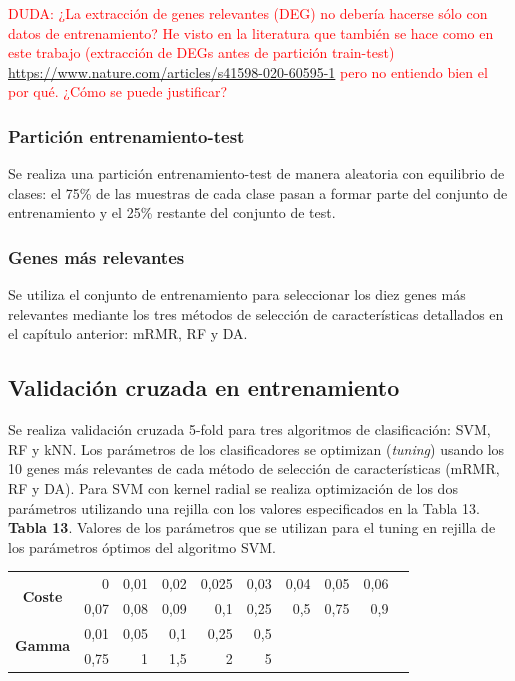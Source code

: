 \textcolor{red}{DUDA: ¿La extracción de genes relevantes (DEG) no debería hacerse sólo con datos de entrenamiento? He visto en la literatura que también se hace como en este trabajo (extracción de DEGs antes de partición train-test) \url{https://www.nature.com/articles/s41598-020-60595-1} pero no entiendo bien el por qué. ¿Cómo se puede justificar?}\\

\subsubsection{Partición entrenamiento-test}

Se realiza una partición entrenamiento-test de manera aleatoria con equilibrio de clases: el 75\% de las muestras de cada clase pasan a formar parte del conjunto de entrenamiento y el 25\% restante del conjunto de test.

\subsubsection{Genes más relevantes}

Se utiliza el conjunto de entrenamiento para seleccionar los diez genes más relevantes mediante los tres métodos de selección de características detallados en el capítulo anterior: mRMR, RF y DA.

\subsection{Validación cruzada en entrenamiento}

Se realiza validación cruzada 5-fold para tres algoritmos de clasificación: SVM, RF y kNN. Los parámetros de los clasificadores se optimizan (\textit{tuning}) usando los 10 genes más relevantes de cada método de selección de características (mRMR, RF y DA). Para SVM con kernel radial se realiza optimización de los dos parámetros utilizando una rejilla con los valores especificados en la Tabla 13.\\

\textbf{Tabla 13}. Valores de los parámetros que se utilizan para el tuning en rejilla de los parámetros óptimos del algoritmo SVM.

\begin{table}[H]
	\centering
	\begin{tabular}{crrrrrrrrr}
		\hline
		\multirow{2}{*}{\textbf{Coste}} & 0    & 0,01 & 0,02         & 0,025                             & 0,03 & 0,04 & 0,05 & 0,06 \\
		& 0,07 & 0,08 & 0,09         & 0,1                               & 0,25 & 0,5  & 0,75 & 0,9  \\ \hline
		\multirow{2}{*}{\textbf{Gamma}} & 0,01 & 0,05 & 0,1 & 0,25 & 0,5  &      &      &      \\
		& 0,75 & 1    & 1,5          & 2                                 & 5    &      &      &      \\ \hline
	\end{tabular}
\end{table}

